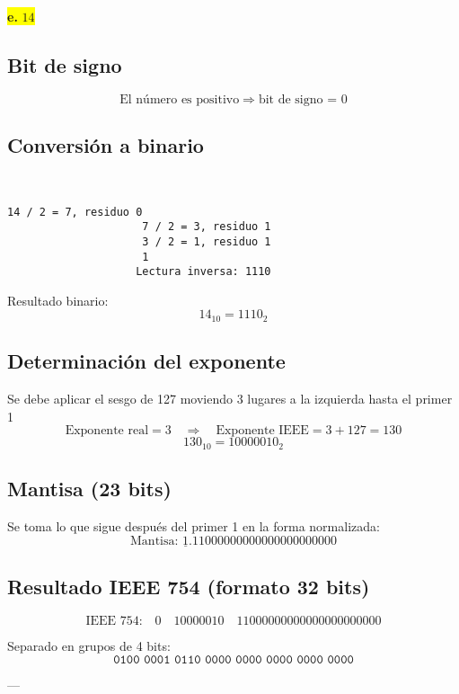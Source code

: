 \documentclass[a4paper,12pt]{article}
\begin{document}
		\begin{center}	
			\colorbox{yellow}{{\textbf{e.} $14$}}
			
			\subsection*{Bit de signo}
			
			\[
			\text{El número es positivo} \Rightarrow \text{bit de signo = } \boxed{0}
			\]
			
			\subsection*{Conversión a binario}
			~~~~~~~
			\begin{center}
				\begin{Verbatim}[formatcom=\centering]
					14 / 2 = 7, residuo 0
					 7 / 2 = 3, residuo 1
					 3 / 2 = 1, residuo 1
					 1
					Lectura inversa: 1110
				\end{Verbatim}
			\end{center}
			
			
			Resultado binario: 
			\[
			14_{10} = 1110_2
			\]
			
			\subsection*{Determinación del exponente}
			
			Se debe aplicar el sesgo de 127 moviendo 3 lugares a la izquierda hasta el primer 1
			\vspace{-0.5em}
			\[
			\text{Exponente real} = 3 \quad \Rightarrow \quad \text{Exponente IEEE} = 3 + 127 = 130
			\]
			\vspace{-0.5em}
			\[
			130_{10} = 10000010_2
			\]
			
			\subsection*{Mantisa (23 bits)}
			
			Se toma lo que sigue después del primer 1 en la forma normalizada:
			\vspace{-0.5em}
			\[
			\text{Mantisa: } \underline{1}.11000000000000000000000
			\]
			
			\subsection*{Resultado IEEE 754 (formato 32 bits)}
			
			\[
			\text{IEEE 754:} \quad 
			\boxed{0} \quad \boxed{10000010} \quad \boxed{11000000000000000000000}
			\]
			
			Separado en grupos de 4 bits:
			\vspace{-0.5em}
			\[
			\texttt{0100\ 0001\ 0110\ 0000\ 0000\ 0000\ 0000\ 0000}
			\]
			
			---	
		\end{center}
	
\end{document}
